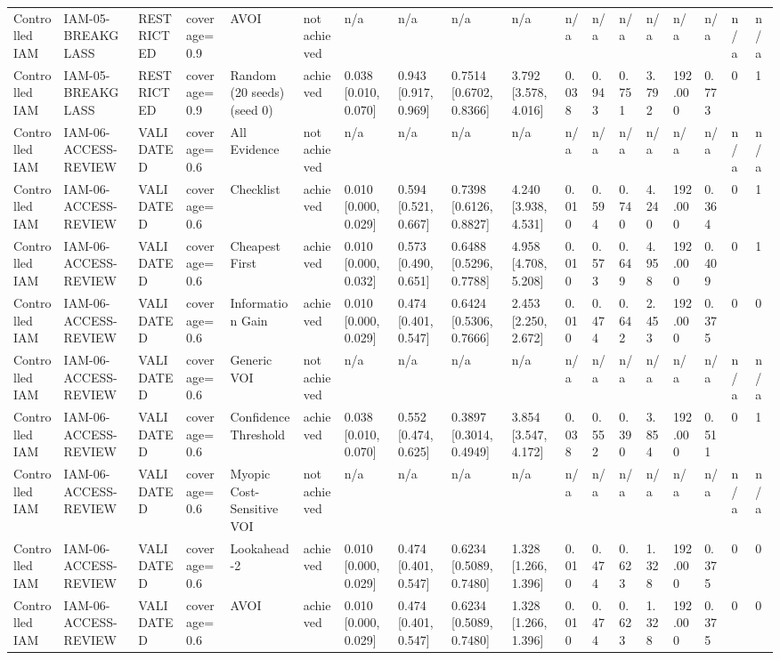 \begin{table}[!ht]
{\begin{tabular}{llllllllllllllllll}
Controlled IAM & IAM-05-BREAKGLASS & RESTRICTED & coverage=0.9 & AVOI & not achieved & n/a & n/a & n/a & n/a & n/a & n/a & n/a & n/a & n/a & n/a & n/a & n/a \\
Controlled IAM & IAM-05-BREAKGLASS & RESTRICTED & coverage=0.9 & Random (20 seeds) (seed 0) & achieved & 0.038 [0.010, 0.070] & 0.943 [0.917, 0.969] & 0.7514 [0.6702, 0.8366] & 3.792 [3.578, 4.016] & 0.038 & 0.943 & 0.751 & 3.792 & 192.000 & 0.773 & 0 & 1 \\
Controlled IAM & IAM-06-ACCESS-REVIEW & VALIDATED & coverage=0.6 & All Evidence & not achieved & n/a & n/a & n/a & n/a & n/a & n/a & n/a & n/a & n/a & n/a & n/a & n/a \\
Controlled IAM & IAM-06-ACCESS-REVIEW & VALIDATED & coverage=0.6 & Checklist & achieved & 0.010 [0.000, 0.029] & 0.594 [0.521, 0.667] & 0.7398 [0.6126, 0.8827] & 4.240 [3.938, 4.531] & 0.010 & 0.594 & 0.740 & 4.240 & 192.000 & 0.364 & 0 & 1 \\
Controlled IAM & IAM-06-ACCESS-REVIEW & VALIDATED & coverage=0.6 & Cheapest First & achieved & 0.010 [0.000, 0.032] & 0.573 [0.490, 0.651] & 0.6488 [0.5296, 0.7788] & 4.958 [4.708, 5.208] & 0.010 & 0.573 & 0.649 & 4.958 & 192.000 & 0.409 & 0 & 1 \\
Controlled IAM & IAM-06-ACCESS-REVIEW & VALIDATED & coverage=0.6 & Information Gain & achieved & 0.010 [0.000, 0.029] & 0.474 [0.401, 0.547] & 0.6424 [0.5306, 0.7666] & 2.453 [2.250, 2.672] & 0.010 & 0.474 & 0.642 & 2.453 & 192.000 & 0.375 & 0 & 0 \\
Controlled IAM & IAM-06-ACCESS-REVIEW & VALIDATED & coverage=0.6 & Generic VOI & not achieved & n/a & n/a & n/a & n/a & n/a & n/a & n/a & n/a & n/a & n/a & n/a & n/a \\
Controlled IAM & IAM-06-ACCESS-REVIEW & VALIDATED & coverage=0.6 & Confidence Threshold & achieved & 0.038 [0.010, 0.070] & 0.552 [0.474, 0.625] & 0.3897 [0.3014, 0.4949] & 3.854 [3.547, 4.172] & 0.038 & 0.552 & 0.390 & 3.854 & 192.000 & 0.511 & 0 & 1 \\
Controlled IAM & IAM-06-ACCESS-REVIEW & VALIDATED & coverage=0.6 & Myopic Cost-Sensitive VOI & not achieved & n/a & n/a & n/a & n/a & n/a & n/a & n/a & n/a & n/a & n/a & n/a & n/a \\
Controlled IAM & IAM-06-ACCESS-REVIEW & VALIDATED & coverage=0.6 & Lookahead-2 & achieved & 0.010 [0.000, 0.029] & 0.474 [0.401, 0.547] & 0.6234 [0.5089, 0.7480] & 1.328 [1.266, 1.396] & 0.010 & 0.474 & 0.623 & 1.328 & 192.000 & 0.375 & 0 & 0 \\
Controlled IAM & IAM-06-ACCESS-REVIEW & VALIDATED & coverage=0.6 & AVOI & achieved & 0.010 [0.000, 0.029] & 0.474 [0.401, 0.547] & 0.6234 [0.5089, 0.7480] & 1.328 [1.266, 1.396] & 0.010 & 0.474 & 0.623 & 1.328 & 192.000 & 0.375 & 0 & 0 \\

\end{tabular}}
\end{table}
